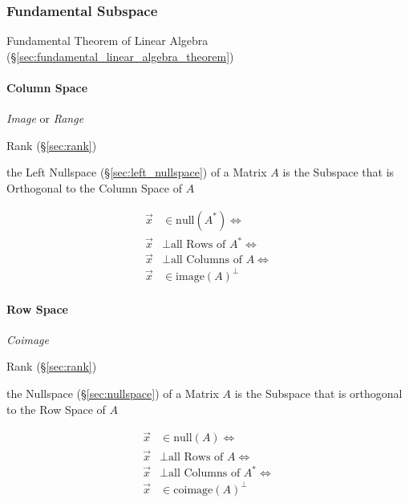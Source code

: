 \subsubsection{Fundamental Subspace}\label{sec:fundamental_subspace}

\fist Fundamental Theorem of Linear Algebra
(\S\ref{sec:fundamental_linear_algebra_theorem})



\paragraph{Column Space}\label{sec:column_space}\hfill

\emph{Image} or \emph{Range}

Rank (\S\ref{sec:rank})

the Left Nullspace (\S\ref{sec:left_nullspace}) of a Matrix $A$ is the Subspace
that is Orthogonal to the Column Space of $A$

\begin{align*}
  \vec{x} & \in \mathrm{null}(A^*) \Leftrightarrow         \\
  \vec{x} & \bot \text{all Rows of }A^* \Leftrightarrow    \\
  \vec{x} & \bot \text{all Columns of }A \Leftrightarrow   \\
  \vec{x} & \in \mathrm{image}(A)^\bot
\end{align*}



\paragraph{Row Space}\label{sec:row_space}\hfill

\emph{Coimage}

Rank (\S\ref{sec:rank})

the Nullspace (\S\ref{sec:nullspace}) of a Matrix $A$ is the Subspace that is
orthogonal to the Row Space of $A$

\begin{align*}
  \vec{x} & \in \mathrm{null}(A) \Leftrightarrow         \\
  \vec{x} & \bot \text{all Rows of }A \Leftrightarrow    \\
  \vec{x} & \bot \text{all Columns of }A^* \Leftrightarrow   \\
  \vec{x} & \in \mathrm{coimage}(A)^\bot
\end{align*}



